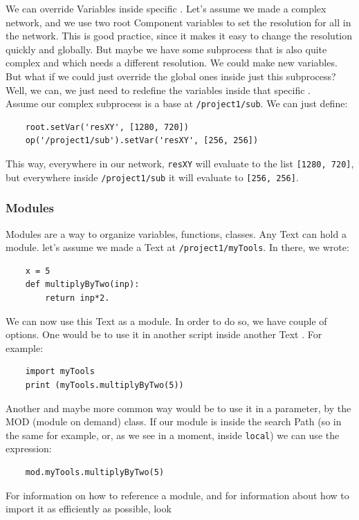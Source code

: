 We can override Variables inside specific \COMPs. Let's assume we made a complex network, and we use two root Component variables to set the resolution for all \TOPs in the network. This is good practice, since it makes it easy to change the resolution quickly and globally. But maybe we have some subprocess that is also quite complex and which needs a different resolution. We could make new variables. But what if we could just override the global ones inside just this subprocess? Well, we can, we just need to redefine the variables inside that specific \COMP.\\

Assume our complex subprocess is a base \COMP at \verb|/project1/sub|. We can just define:
\begin{lstlisting}
	root.setVar('resXY', [1280, 720])
	op('/project1/sub').setVar('resXY', [256, 256])
\end{lstlisting}
This way, everywhere in our network, \verb|resXY| will evaluate to the list \verb|[1280, 720]|, but everywhere inside \verb|/project1/sub| it will evaluate to \verb|[256, 256]|.

\subsubsection{Modules} %
\label{ssub:Modules}
Modules are a way to organize variables, functions, classes. Any Text \DAT can hold a module.
let's assume we made a Text \DAT at \verb|/project1/myTools|. In there, we wrote:
\begin{lstlisting}
	x = 5
	def multiplyByTwo(inp):
		return inp*2.
\end{lstlisting}
\testThis


We can now use this Text \DAT as a module. In order to do so, we have couple of options. One would be to use it in another script inside another Text \DAT. For example:
\begin{lstlisting}
	import myTools
	print (myTools.multiplyByTwo(5))
\end{lstlisting}

Another and maybe more common way would be to use it in a parameter, by the MOD (module on demand) class. If our module is inside the search Path (so in the same \COMP for example, or, as we see in a moment, inside \verb|local|) we can use the expression:
\begin{lstlisting}
	mod.myTools.multiplyByTwo(5)
\end{lstlisting}

For information on how to reference a module, and for information about how to import it as efficiently as possible, look 

